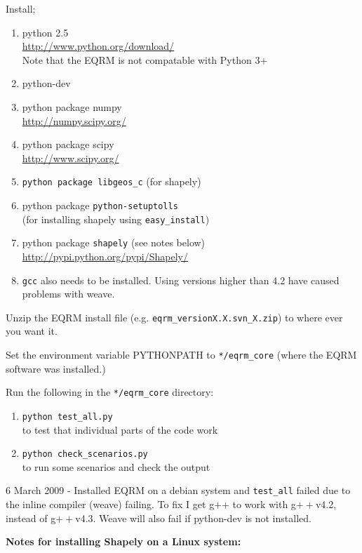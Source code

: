 \documentclass[a4paper, 12pt]{article}
\begin{document}
Install;
\begin{enumerate}
\item python 2.5 \\
\url{http://www.python.org/download/} \\
Note that the EQRM is not compatable with Python 3$+$ \\
\item python-dev
\item python package numpy \\
\url{http://numpy.scipy.org/}
\item python package scipy \\
\url{http://www.scipy.org/}
\item \texttt{python package libgeos\_c} (for shapely)
\item python package \texttt{python-setuptolls} \\
(for installing shapely using \texttt{easy\_install})
\item python package \texttt{shapely}  (see notes below) \\
\url{http://pypi.python.org/pypi/Shapely/}
\item \texttt{gcc} also needs to be installed. Using versions higher than 4.2
have caused problems with weave.
\end{enumerate}

Unzip the EQRM install file (e.g.
\texttt{eqrm\_versionX.X.svn\_X.zip}) to where ever you want it.

Set the environment variable PYTHONPATH to \texttt{*/eqrm\_core}
(where the EQRM software was installed.)

Run the following in the \texttt{*/eqrm\_core} directory:
\begin{enumerate}
\item \texttt{python test\_all.py} \\
to test that individual parts of the code work
\item \texttt{python check\_scenarios.py} \\
to run some scenarios and check the output
\end{enumerate}

6 March 2009 - Installed EQRM on a debian system and
\texttt{test\_all} failed due to the inline compiler (weave)
failing.  To fix I get g++ to work with g$++$v4.2, instead of
g$++$v4.3.  Weave will also fail if python-dev is not installed.


\textbf{Notes for installing Shapely on a Linux system:} \\
\end{document}

